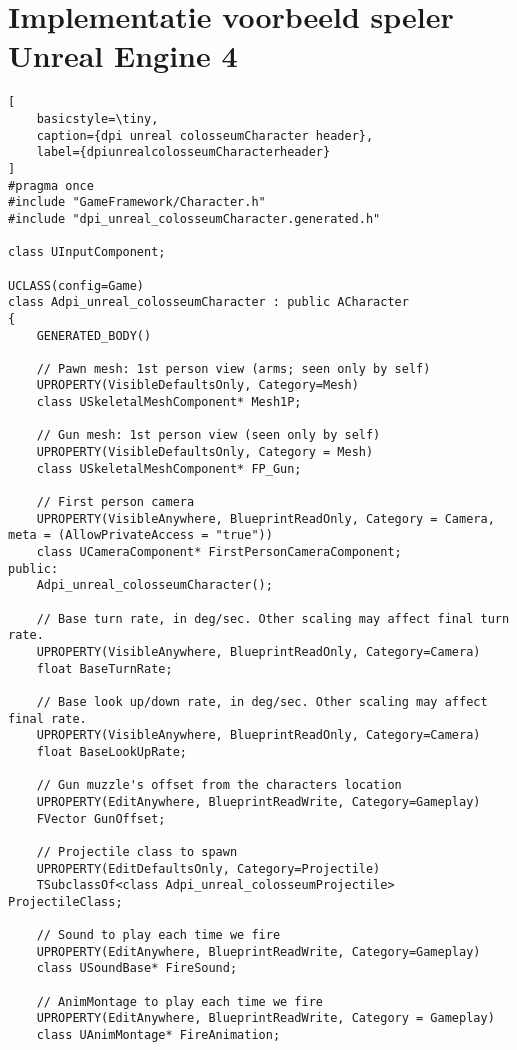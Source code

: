 \lstset {language=C++}
\lhead{}
\chapter{Implementatie voorbeeld speler Unreal Engine 4}
\label{appendix:dpi_unreal_colosseumCharacter}

\begin{lstlisting}[
	basicstyle=\tiny, 
	caption={dpi unreal colosseumCharacter header}, 
	label={dpiunrealcolosseumCharacterheader}
]
#pragma once
#include "GameFramework/Character.h"
#include "dpi_unreal_colosseumCharacter.generated.h"

class UInputComponent;

UCLASS(config=Game)
class Adpi_unreal_colosseumCharacter : public ACharacter
{
	GENERATED_BODY()

	// Pawn mesh: 1st person view (arms; seen only by self) 
	UPROPERTY(VisibleDefaultsOnly, Category=Mesh)
	class USkeletalMeshComponent* Mesh1P;

	// Gun mesh: 1st person view (seen only by self) 
	UPROPERTY(VisibleDefaultsOnly, Category = Mesh)
	class USkeletalMeshComponent* FP_Gun;

	// First person camera 
	UPROPERTY(VisibleAnywhere, BlueprintReadOnly, Category = Camera, meta = (AllowPrivateAccess = "true"))
	class UCameraComponent* FirstPersonCameraComponent;
public:
	Adpi_unreal_colosseumCharacter();

	// Base turn rate, in deg/sec. Other scaling may affect final turn rate. 
	UPROPERTY(VisibleAnywhere, BlueprintReadOnly, Category=Camera)
	float BaseTurnRate;

	// Base look up/down rate, in deg/sec. Other scaling may affect final rate. 
	UPROPERTY(VisibleAnywhere, BlueprintReadOnly, Category=Camera)
	float BaseLookUpRate;

	// Gun muzzle's offset from the characters location 
	UPROPERTY(EditAnywhere, BlueprintReadWrite, Category=Gameplay)
	FVector GunOffset;

	// Projectile class to spawn 
	UPROPERTY(EditDefaultsOnly, Category=Projectile)
	TSubclassOf<class Adpi_unreal_colosseumProjectile> ProjectileClass;

	// Sound to play each time we fire 
	UPROPERTY(EditAnywhere, BlueprintReadWrite, Category=Gameplay)
	class USoundBase* FireSound;

	// AnimMontage to play each time we fire 
	UPROPERTY(EditAnywhere, BlueprintReadWrite, Category = Gameplay)
	class UAnimMontage* FireAnimation;


\end{lstlisting}
